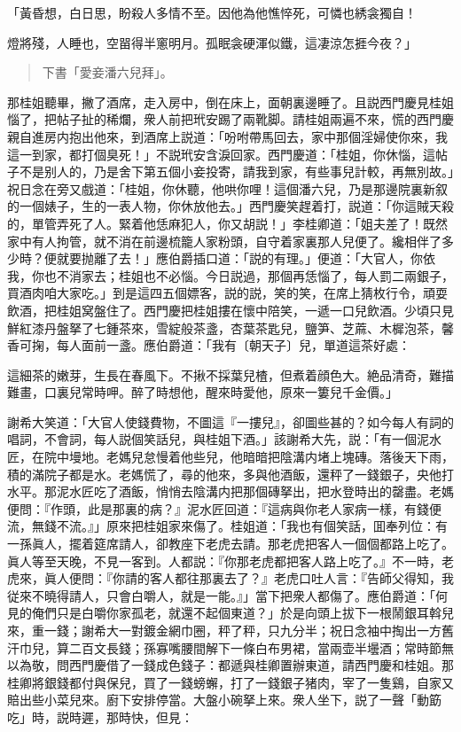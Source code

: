 \begin{myquote}
「黃昏想，白日思，盼殺人多情不至。因他為他憔悴死，可憐也綉衾獨自！

燈將殘，人睡也，空㽞得半窻明月。孤眠衾硬渾似鐵，這凄涼怎捱今夜？」
\end{myquote}

\begin{quotation}
\begin{flushright}
下書「愛妾潘六兒拜」。
\end{flushright}
\end{quotation}

那桂姐聽畢，撇了酒席，走入房中，倒在床上，面朝裏邊睡了。且説西門慶見桂姐惱了，把帖子扯的稀爛，衆人前把玳安踢了兩靴脚。請桂姐兩遍不來，慌的西門慶親自進房内抱出他來，到酒席上説道：「吩咐帶馬回去，家中那個淫婦使你來，我這一到家，都打個臭死！」不説玳安含淚回家。西門慶道：「桂姐，你休惱，這帖子不是别人的，乃是舍下第五個小妾投寄，請我到家，有些事兒計較，再無別故。」祝日念在旁又戲道：「桂姐，你休聽，他哄你哩！這個潘六兒，乃是那邊院裏新叙的一個婊子，生的一表人物，你休放他去。」西門慶笑趕着打，説道：「你這賊天殺的，單管弄死了人。緊着他恁麻犯人，你又胡説！」李桂卿道：「姐夫差了！既然家中有人拘管，就不消在前邊梳籠人家粉頭，自守着家裏那人兒便了。纔相伴了多少時？便就要抛離了去！」應伯爵插口道：「説的有理。」便道：「大官人，你依我，你也不消家去；桂姐也不必惱。今日説過，那個再恁惱了，每人罰二兩銀子，買酒肉咱大家吃。」到是這四五個嫖客，説的説，笑的笑，在席上猜枚行令，頑耍飲酒，把桂姐窝盤住了。西門慶把桂姐摟在懷中陪笑，一遞一口兒飲酒。少頃只見鮮紅漆丹盤拏了七鍾茶來，雪綻般茶盞，杏葉茶匙兒，鹽笋、芝蔴、木樨泡茶，馨香可掬，每人面前一盞。應伯爵道：「我有〔朝天子〕兒，單道這茶好處：

\begin{myquote}
這細茶的嫩芽，生長在春風下。不揪不採葉兒楂，但煮着顔色大。絶品清奇，難描難畫，口裏兒常時呷。醉了時想他，醒來時愛他，原來一簍兒千金價。」
\end{myquote}

謝希大笑道：「大官人使錢費物，不圖這『一摟兒』，卻圖些甚的？如今每人有詞的唱詞，不會詞，每人説個笑話兒，與桂姐下酒。」該謝希大先，説：「有一個泥水匠，在院中墁地。老媽兒怠慢着他些兒，他暗暗把陰溝内堵上塊磚。落後天下雨，積的滿院子都是水。老媽慌了，尋的他來，多與他酒飯，還秤了一錢銀子，央他打水平。那泥水匠吃了酒飯，悄悄去陰溝内把那個磚拏出，把水登時出的罄盡。老媽便問：『作頭，此是那裏的病？』泥水匠回道：『這病與你老人家病一樣，有錢便流，無錢不流。』」原來把桂姐家來傷了。桂姐道：「我也有個笑話，囬奉列位：有一孫眞人，擺着筵席請人，卻教座下老虎去請。那老虎把客人一個個都路上吃了。眞人等至天晚，不見一客到。人都説：『你那老虎都把客人路上吃了。』不一時，老虎來，眞人便問：『你請的客人都往那裏去了？』老虎口吐人言：『告師父得知，我従來不曉得請人，只會白嚼人，就是一能。』」當下把衆人都傷了。應伯爵道：「何見的俺們只是白嚼你家孤老，就還不起個東道？」於是向頭上拔下一根鬧銀耳斡兒來，重一錢；謝希大一對鍍金網巾圈，秤了秤，只九分半；祝日念袖中掏出一方舊汗巾兒，算二百文長錢；孫寡嘴腰間解下一條白布男裙，當兩壶半壜酒；常時節無以為敬，問西門慶借了一錢成色錢子：都遞與桂卿置辦東道，請西門慶和桂姐。那桂卿將銀錢都付與保兒，買了一錢螃蠏，打了一錢銀子猪肉，宰了一隻鷄，自家又賠出些小菜兒來。廚下安排停當。大盤小碗拏上來。衆人坐下，説了一聲「動筯吃」時，説時遲，那時快，但見：

